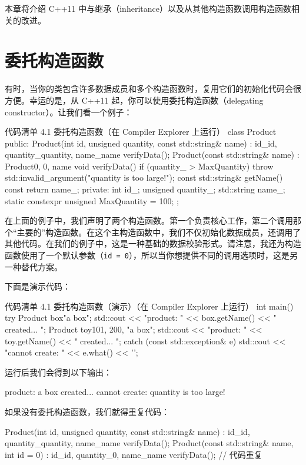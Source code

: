 本章将介绍 C++11 中与继承（inheritance）以及从其他构造函数调用构造函数相关的改进。

\section{委托构造函数}

有时，当你的类包含许多数据成员和多个构造函数时，复用它们的初始化代码会很方便。幸运的是，从 C++11 起，你可以使用委托构造函数（delegating constructor）。让我们看一个例子：

\begin{codeboxt}[cpp]{代码清单 4.1 委托构造函数（在 Compiler Explorer 上运行）}
class Product {
public:
Product(int id, unsigned quantity, const std::string& name)
: id_{id}, quantity_{quantity}, name_{name} {
verifyData();
}
Product(const std::string& name)
: Product{0, 0, name}
{ }
void verifyData() {
if (quantity_ > MaxQuantity)
throw std::invalid_argument("quantity is too large!");
}
const std::string& getName() const { return name_; }
private:
int id_;
unsigned quantity_;
std::string name_;
static constexpr unsigned MaxQuantity = 100;
};
\end{codeboxt}

在上面的例子中，我们声明了两个构造函数。第一个负责核心工作，第二个调用那个“主要的”构造函数。在这个主构造函数中，我们不仅初始化数据成员，还调用了其他代码。在我们的例子中，这是一种基础的数据校验形式。请注意，我还为构造函数使用了一个默认参数（\texttt{id = 0}），所以当你想提供不同的调用选项时，这是另一种替代方案。

下面是演示代码：

\begin{codeboxt}[cpp]{代码清单 4.1 委托构造函数（演示）（在 Compiler Explorer 上运行）}
int main() {
try {
Product box{"a box"};
std::cout << "product: " << box.getName() << " created... \n";
Product toy{101, 200, "a box"};
std::cout << "product: " << toy.getName() << " created... \n";
}
catch (const std::exception& e) {
std::cout << "cannot create: " << e.what() << '\n';
}
}
\end{codeboxt}

运行后我们会得到以下输出：

\begin{codebox}[cpp]
product: a box created...
cannot create: quantity is too large!
\end{codebox}

如果没有委托构造函数，我们就得重复代码：

\begin{codebox}[cpp]
Product(int id, unsigned quantity, const std::string& name)
: id_{id}, quantity_{quantity}, name_{name} {
verifyData();
}
Product(const std::string& name, int id = 0)
: id_{id}, quantity_{0}, name_{name} {
verifyData();
// 代码重复
}
\end{codebox}

